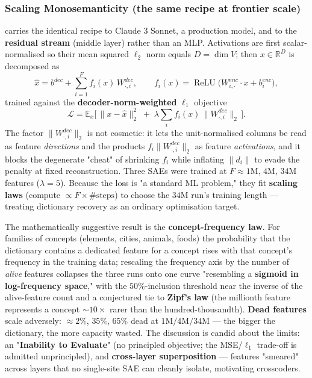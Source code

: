 \subsubsection*{Scaling Monosemanticity (the same recipe at frontier scale)}

\textcite{scaling-monosemanticity} carries the identical recipe to Claude 3 Sonnet, a production model, and to the \textbf{residual stream} (middle layer) rather than an MLP. Activations are first scalar-normalised so their mean squared $\ell_2$ norm equals $D=\dim V$; then $x\in\mathbb{R}^{D}$ is decomposed as
\[
\hat x = b^{dec}+\sum_{i=1}^{F} f_i(x)\,W^{dec}_{\cdot,i},\qquad
f_i(x)=\operatorname{ReLU}\!\big(W^{enc}_{i,\cdot}\!\cdot x + b^{enc}_i\big),
\]
trained against the \textbf{decoder-norm-weighted} $\ell_1$ objective
\[
\mathcal{L}=\mathbb{E}_{x}\Big[\,\lVert x-\hat x\rVert_{2}^{2}\;+\;\lambda\sum_i f_i(x)\,\lVert W^{dec}_{\cdot,i}\rVert_{2}\,\Big].
\]
The factor $\lVert W^{dec}_{\cdot,i}\rVert_2$ is not cosmetic: it lets the unit-normalised columns be read as feature \emph{directions} and the products $f_i\lVert W^{dec}_{\cdot,i}\rVert_2$ as feature \emph{activations}, and it blocks the degenerate "cheat" of shrinking $f_i$ while inflating $\lVert d_i\rVert$ to evade the penalty at fixed reconstruction. Three SAEs were trained at $F\approx 1\mathrm{M},\,4\mathrm{M},\,34\mathrm{M}$ features ($\lambda=5$). Because the loss is "a standard ML problem," they fit \textbf{scaling laws} (compute $\propto F\times\#\text{steps}$) to choose the $34\mathrm{M}$ run's training length --- treating dictionary recovery as an ordinary optimisation target.

The mathematically suggestive result is the \textbf{concept-frequency law}. For families of concepts (elements, cities, animals, foods) the probability that the dictionary contains a dedicated feature for a concept rises with that concept's frequency in the training data; rescaling the frequency axis by the number of \emph{alive} features collapses the three runs onto one curve "resembling a \textbf{sigmoid in log-frequency space}," with the $50\%$-inclusion threshold near the inverse of the alive-feature count and a conjectured tie to \textbf{Zipf's law} (the millionth feature represents a concept $\sim\!10\times$ rarer than the hundred-thousandth). \textbf{Dead features} scale adversely: $\approx 2\%$, $35\%$, $65\%$ dead at $1\mathrm{M}/4\mathrm{M}/34\mathrm{M}$ --- the bigger the dictionary, the more capacity wasted. The discussion is candid about the limits: an "\textbf{Inability to Evaluate}" (no principled objective; the MSE/$\ell_1$ trade-off is admitted unprincipled), and \textbf{cross-layer superposition} --- features "smeared" across layers that no single-site SAE can cleanly isolate, motivating crosscoders.


